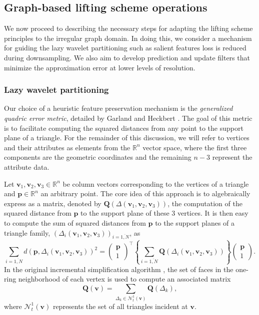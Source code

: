 \documentclass[graybox]{svmult}
\begin{document}
	\subsection{Graph-based lifting scheme operations}
	We now proceed to describing the necessary steps for adapting the lifting scheme principles to the irregular graph domain. In doing this, we consider a mechanism for guiding the lazy wavelet partitioning such as salient features loss is reduced during downsampling. We also aim to develop prediction and update filters that minimize the approximation error at lower levels of resolution.
	
	\subsubsection{Lazy wavelet partitioning}
	Our choice of a heuristic feature preservation mechanism is the
	\emph{generalized quadric error metric}, detailed by Garland and Heckbert \cite{Garland1998}. The goal of this metric is to facilitate computing the squared distances from any point to the support plane of a triangle. For the remainder of this discussion, we will refer to vertices and their attributes as elements from the $\mathbb{R}^n$ vector space, where the first three components are the geometric coordinates and the remaining $n-3$ represent the attribute data.
	
	
	Let $\mathbf{v}_1, \mathbf{v}_2, \mathbf{v}_3 \in \mathbb{R}^n$ be column vectors corresponding to the vertices of a triangle and $\mathbf{p} \in \mathbb{R}^n$  an arbitrary point.
	The core idea of this approach is to algebraically express as a matrix, denoted by $\mathbf{Q}(\Delta(\mathbf{v}_1, \mathbf{v}_2, \mathbf{v}_3))$, the computation of the squared distance from  $\mathbf{p}$ to the support plane of these 3 vertices. It is then easy to compute the sum of squared distances from $\mathbf{p}$ to  the support planes of a triangle family, $\left( \Delta_i(\mathbf{v}_{1}, \mathbf{v}_{2}, \mathbf{v}_{3}) \right)_{i=\overline{1,N}}$, as
	\begin{equation}
	\sum\limits_{i=\overline{1,N}}{d(\mathbf{p},  \Delta_i(\mathbf{v}_{1}, \mathbf{v}_{2}, \mathbf{v}_{3}) )^2 } = 
	\begin{pmatrix} \mathbf{p} \\ 1 \end{pmatrix}^\intercal \left\{  \sum\limits_{i=\overline{1,N}} \mathbf{Q}\left(  \Delta_i(\mathbf{v}_{1}, \mathbf{v}_{2}, \mathbf{v}_{3}) \right) \right\} \begin{pmatrix} \mathbf{p} \\ 1 \end{pmatrix}.
	\label{eq_cds:quadric_addition}
	\end{equation}
	In the original incremental simplification algorithm \cite{Garland1998}, the set of faces in the one-ring neighborhood of each vertex is used to compute an associated matrix
	\begin{equation}
	\mathbf{Q(v)} = \sum\limits_{\Delta_k \in \mathcal{N}_t^1(\mathbf{v})}{ \mathbf{Q}(\Delta_k) },
	\label{eq_cds:vertex_quadric_error_matrix}
	\end{equation} 
	where $\mathcal{N}_t^1(\mathbf{v})$ represents the set of all triangles incident at $\mathbf{v}$.
	
\end{document}
